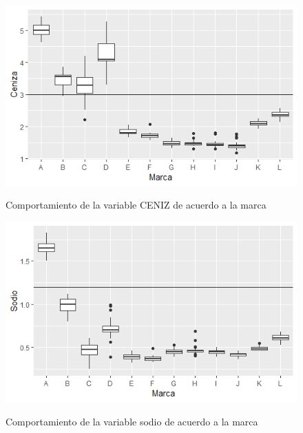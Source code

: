 \documentclass[pdf]{beamer}
\begin{document}
\begin{frame}
\begin{figure}[h]
\centering
\includegraphics[scale=1]{images/ceniz.png} 
\label{i6}
\caption{Comportamiento de la variable CENIZ de acuerdo a la marca}
\end{figure}
\end{frame}


\begin{frame}
\begin{figure}[h]
\centering
\includegraphics[scale=1]{images/sodio.png} 
\label{i7}
\caption{Comportamiento de la variable sodio de acuerdo a la marca}
\end{figure}
\end{frame}
\end{document}
